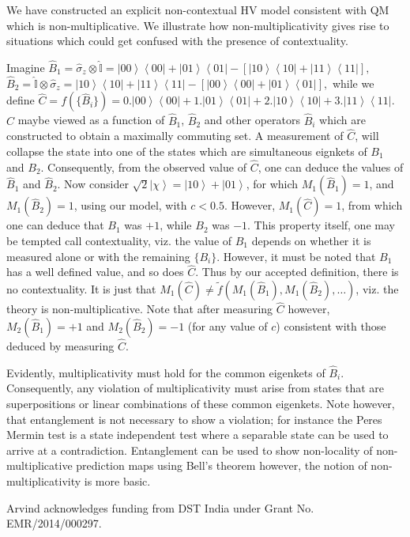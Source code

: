 \documentclass[british,aps,prl,superscriptaddress,nofootinbib,times,reprint]{revtex4-1}
\theoremstyle{plain}
\theoremstyle{plain}
\theoremstyle{definition}
\theoremstyle{remark}
\theoremstyle{remark}
\theoremstyle{remark}
\theoremstyle{plain}
\theoremstyle{plain}
\theoremstyle{plain}
\theoremstyle{definition}
\theoremstyle{definition}
\begin{document}
We have  constructed an explicit non-contextual HV
model consistent with QM which is
non-multiplicative. We illustrate how
non-multiplicativity gives rise to situations which
could get confused with the presence of contextuality.

Imagine
$
\hat{B}_{1}=\hat{\sigma}_{z}\otimes\hat{\mathbb{I}}=
\left|00\right\rangle
\left\langle 00\right|+\left|01\right\rangle
\left\langle 01\right|-\left[\left|10\right\rangle
\left\langle 10\right|+\left|11\right\rangle
\left\langle 11\right|\right],
$ 
$
\hat{B}_{2}=\hat{\mathbb{I}}\otimes\hat{\sigma}_{z}=
\left|10\right\rangle
\left\langle 10\right|+\left|11\right\rangle
\left\langle 11\right|-\left[\left|00\right\rangle
\left\langle 00\right|+\left|01\right\rangle
\left\langle 01\right|\right],
$ 
while we define 
$
\hat{C}=f(\{\hat{B}_{i}\})
=0.\left|00\right\rangle \left\langle
00\right|+1.\left|01\right\rangle \left\langle
01\right|+2.\left|10\right\rangle \left\langle
10\right|+3.\left|11\right\rangle \left\langle
11\right|. 
$
$\hat{C}$ maybe viewed as a function of
$\hat{B}_{1}$, $\hat{B}_{2}$ and other operators
$\hat{B}_{i}$ which are constructed to obtain a
maximally commuting set. A measurement of
$\hat{C}$, will collapse the state into one of the
states which are simultaneous eignkets of $B_{1}$
and $B_{2}$. Consequently, from the observed value
of $\hat{C}$, one can deduce the values of
$\hat{B}_{1}$ and $\hat{B}_{2}$. Now consider
$\sqrt{2}\left|\chi\right\rangle
=\left|10\right\rangle +\left|01\right\rangle $,
for which $M_{1}(\hat{B}_{1})=1$, and
$M_{1}(\hat{B}_{2})=1$, using our model,
with $c<0.5$. However, $M_{1}(\hat{C})=1$, from
which one can deduce that $B_{1}$ was $+1$, while
$B_{2}$ was $-1$.  This property itself, one may
be tempted call contextuality, viz.  the value of
$B_{1}$ depends on whether it is measured alone or
with the remaining $\{B_{i}\}$. However, it must
be noted that $B_{1}$ has a well defined value,
and so does $\hat{C}$. Thus by our accepted
definition, there is no contextuality. It is just
that $M_{1}(\hat{C})\neq \tilde
f(M_{1}(\hat{B}_{1}),M_{1}(\hat{B}_{2}),\dots)$,
viz. the theory is non-multiplicative. Note that
after measuring $\hat{C}$ however,
$M_{2}(\hat{B}_{1})=+1$ and
$M_{2}(\hat{B}_{2})=-1$ (for any value of $c$)
consistent with those deduced by measuring
$\hat{C}$.


Evidently, multiplicativity must hold for the
common eigenkets of $\hat{B}_{i}$.  Consequently,
any violation of multiplicativity must arise from
states that are superpositions or linear
combinations of these common eigenkets.  Note
however, that entanglement is not necessary to
show a violation; for instance the Peres Mermin
test is a state independent test where a separable
state can be used to arrive at a contradiction.
Entanglement can be used to show non-locality of
non-multiplicative prediction maps using Bell's
theorem  however, the notion of non-multiplicativity
is more basic.  \begin{acknowledgments} Arvind
acknowledges funding from DST India under Grant
No. EMR/2014/000297.  \end{acknowledgments}
%
 
\end{document}
